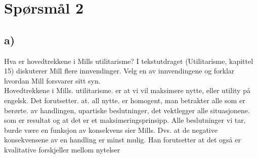 \documentclass[12pt, a4paper]{article}
\begin{document}
\section{Spørsmål 2}

\subsection{a)}
Hva er hovedtrekkene i Mills utilitarisme? I tekstutdraget (Utilitarisme, kapittel 15)
diskuterer Mill flere innvendinger. Velg en av innvendingene og forklar hvordan Mill
forsvarer sitt syn.\\

Hovedtrekkene i Mills. utilitarisme. er at vi vil maksimere nytte,  eller utility på engelsk. Det forutsetter. at. all nytte. er homogent, man betrakter alle som er berørte. av handlingen, upartiske beslutninger, det vektlegger alle situasjonene. som er resultat og at det er et maksimeringsprinsipp. Alle beslutninger vi tar, burde være en funksjon av konsekvens sier Mills.  Dvs. at de negative konsekvensene av en handling er minst mulig. Han forutsetter at det også er kvalitative forskjeller mellom nytelser
\end{document}
